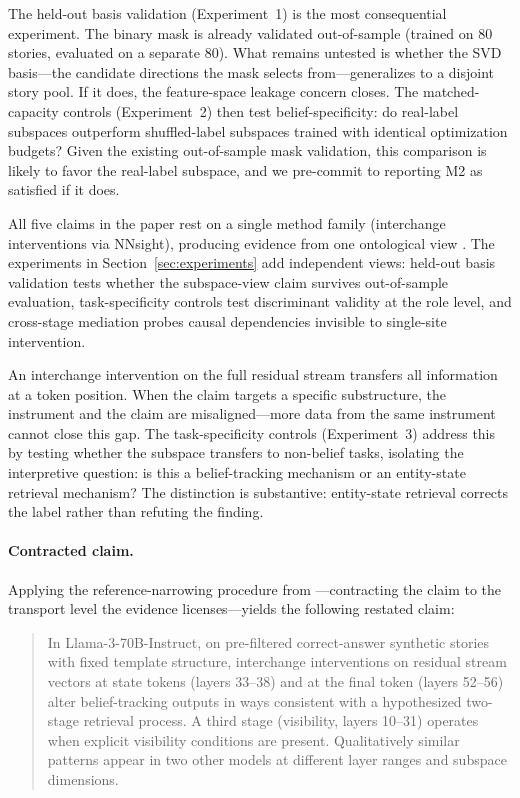\documentclass[11pt]{article}
\begin{document}
The held-out basis validation (Experiment~1) is the most consequential experiment. The binary mask is already validated out-of-sample (trained on 80 stories, evaluated on a separate 80). What remains untested is whether the SVD basis---the candidate directions the mask selects from---generalizes to a disjoint story pool. If it does, the feature-space leakage concern closes. The matched-capacity controls (Experiment~2) then test belief-specificity: do real-label subspaces outperform shuffled-label subspaces trained with identical optimization budgets? Given the existing out-of-sample mask validation, this comparison is likely to favor the real-label subspace, and we pre-commit to reporting M2 as satisfied if it does.

All five claims in the paper rest on a single method family (interchange interventions via NNsight), producing evidence from one ontological view \citep{tower2026mechviews}. The experiments in Section~\ref{sec:experiments} add independent views: held-out basis validation tests whether the subspace-view claim survives out-of-sample evaluation, task-specificity controls test discriminant validity at the role level, and cross-stage mediation probes causal dependencies invisible to single-site intervention.

An interchange intervention on the full residual stream transfers all information at a token position. When the claim targets a specific substructure, the instrument and the claim are misaligned---more data from the same instrument cannot close this gap. The task-specificity controls (Experiment~3) address this by testing whether the subspace transfers to non-belief tasks, isolating the interpretive question: is this a belief-tracking mechanism or an entity-state retrieval mechanism? The distinction is substantive: entity-state retrieval corrects the label rather than refuting the finding.

\paragraph{Contracted claim.}
Applying the reference-narrowing procedure from \citet{tower2026mechref}---contracting the claim to the transport level the evidence licenses---yields the following restated claim:

\begin{quote}
In Llama-3-70B-Instruct, on pre-filtered correct-answer synthetic stories with fixed template structure, interchange interventions on residual stream vectors at state tokens (layers 33--38) and at the final token (layers 52--56) alter belief-tracking outputs in ways consistent with a hypothesized two-stage retrieval process. A third stage (visibility, layers 10--31) operates when explicit visibility conditions are present. Qualitatively similar patterns appear in two other models at different layer ranges and subspace dimensions.
\end{quote}
\end{document}
